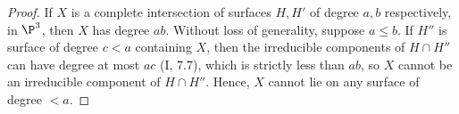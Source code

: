 \documentclass[a4paper]{article}
\begin{document}
\begin{enumerate} [label=\textbf{\arabic*.}, leftmargin=0em]
          \begin{proof}
              If $X$ is a complete intersection of surfaces $H, H'$ of degree $a, b$ respectively, in $\P^3$, then $X$ has degree $ab$.
              Without loss of generality, suppose $a \leq b$.
              If $H''$ is surface of degree $c < a$ containing $X$, then the irreducible components of $H \cap H''$ can have degree at most $ac$ (I, 7.7), which is strictly less than $ab$, so $X$ cannot be an irreducible component of $H \cap H''$.
              Hence, $X$ cannot lie on any surface of degree $< a$.
          \end{proof}

\end{enumerate}
\end{document}
